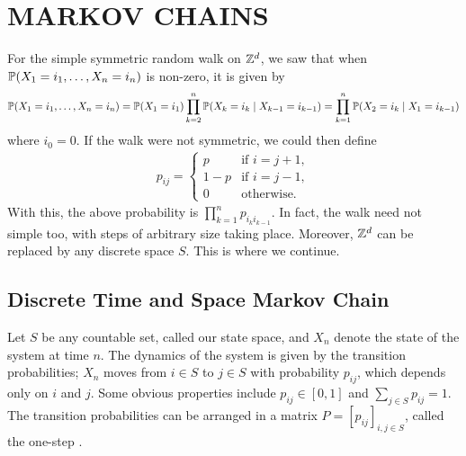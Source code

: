 \chapter{MARKOV CHAINS}

For the simple symmetric random walk on $\mathbb{Z}^{d}$, we saw that when $\mathbb{P}(X_{1}=i_{1},\ldots,X_{n}=i_{n})$ is non-zero, it is given by
\begin{align}
    \mathbb{P}(X_{1}=i_{1},\ldots,X_{n}=i_{n}) = \mathbb{P}(X_{1}=i_{1})\prod_{k=2}^{n}\mathbb{P}(X_{k}=i_{k} \mid X_{k-1}=i_{k-1}) = \prod_{k=1}^{n} \mathbb{P}(X_{2}=i_{k} \mid X_{1}=i_{k-1})
\end{align}
where $i_{0} = 0$. If the walk were not symmetric, we could then define
\begin{align}
    p_{ij} = \begin{cases}
        p &\text{if } i = j+1,\\
        1-p &\text{if } i = j-1,\\
        0 &\text{otherwise.}
    \end{cases}
\end{align}
With this, the above probability is $\prod_{k=1}^{n} p_{i_{k}i_{k-1}}$. In fact, the walk need not simple too, with steps of arbitrary size taking place. Moreover, $\mathbb{Z}^{d}$ can be replaced by any discrete space $S$. This is where we continue.

\section{Discrete Time and Space Markov Chain}
Let $S$ be any countable set, called our state space, and $X_{n}$ denote the state of the system at time $n$. The dynamics of the system is given by the transition probabilities; $X_{n}$ moves from $i \in S$ to $j \in S$ with probability $p_{ij}$, which depends only on $i$ and $j$. Some obvious properties include $p_{ij} \in [0,1]$ and $\sum_{j \in S} p_{ij} = 1$. The transition probabilities can be arranged in a matrix $P = [p_{ij}]_{i,j \in S}$, called the one-step .

